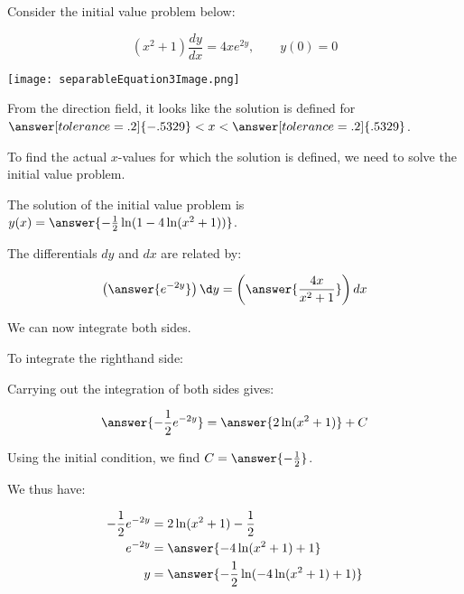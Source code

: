 \documentclass{ximera}
\author{Jim Talamo}
\begin{document}
\begin{exercise}
Consider the initial value problem below:

\[
(x^2+1) \frac{dy}{dx} = 4xe^{2y}  , \qquad y(0)=0
\]

 \begin{image}
  \texttt{[image: separableEquation3Image.png]}
\end{image}

\begin{exercise}
From the direction field, it looks like the solution is defined for $\answer[tolerance=.2]{-.5329}<x<\answer[tolerance=.2]{.5329}$.
\end{exercise}

\begin{exercise}
To find the actual $x$-values for which the solution is defined, we need to solve the initial value problem.

The solution of the initial value problem is $y(x) = \answer{-\frac{1}{2}\ln(1-4 \ln(x^2+1))  }$.

\begin{hint}
The differentials $dy$ and $dx$ are related by:

\[
\left(\answer{e^{-2y}} \right) \d y = \left(\answer{ \frac{4x}{x^2+1} } \right) dx
\]

\begin{question}
We can now integrate both sides.

To integrate the righthand side:

\begin{multipleChoice}
\end{multipleChoice}

Carrying out the integration of both sides gives:

\begin{align*}
\answer{-\frac{1}{2}e^{-2y}} &= \answer{2 \ln(x^2+1)} +C\\
\end{align*}

Using the initial condition, we find $C=\answer{-\frac{1}{2}}$.

\begin{question}

We thus have:

\begin{align*}
-\frac{1}{2}e^{-2y} &= 2 \ln(x^2+1) -\frac{1}{2} \\
e^{-2y} &= \answer{-4 \ln(x^2+1)+1} \\
y&= \answer{-\frac{1}{2}\ln(-4 \ln(x^2+1)+1)}
\end{align*}


\end{question}
\end{question}
\end{hint}
\end{exercise}
\end{exercise}
\end{document}
